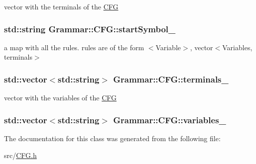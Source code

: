 vector with the terminals of the \hyperlink{classGrammar_1_1CFG}{\-C\-F\-G} 

\hypertarget{classGrammar_1_1CFG_aaddc2586c72b3f257acf18bf98881623}{
\subsubsection[{start\-Symbol\-\_\-}]{\setlength{\rightskip}{0pt plus 5cm}std\-::string {\bf \-Grammar\-::\-C\-F\-G\-::start\-Symbol\-\_\-}}}\label{dd/dc1/classGrammar_1_1CFG_aaddc2586c72b3f257acf18bf98881623}


a map with all the rules. rules are of the form $<$\-Variable$>$, vector$<$\-Variables, terminals$>$ 

\hypertarget{classGrammar_1_1CFG_a65298cf1151bb130a382a4858d99a571}{
\subsubsection[{terminals\-\_\-}]{\setlength{\rightskip}{0pt plus 5cm}std\-::vector$<$std\-::string$>$ {\bf \-Grammar\-::\-C\-F\-G\-::terminals\-\_\-}}}\label{dd/dc1/classGrammar_1_1CFG_a65298cf1151bb130a382a4858d99a571}


vector with the variables of the \hyperlink{classGrammar_1_1CFG}{\-C\-F\-G} 

\hypertarget{classGrammar_1_1CFG_a7041e847818a2e4777bc41d0c2f1db2c}{
\subsubsection[{variables\-\_\-}]{\setlength{\rightskip}{0pt plus 5cm}std\-::vector$<$std\-::string$>$ {\bf \-Grammar\-::\-C\-F\-G\-::variables\-\_\-}}}\label{dd/dc1/classGrammar_1_1CFG_a7041e847818a2e4777bc41d0c2f1db2c}


\-The documentation for this class was generated from the following file\-:\begin{DoxyCompactItemize}
\item 
src/\hyperlink{CFG_8h}{\-C\-F\-G.\-h}\end{DoxyCompactItemize}

